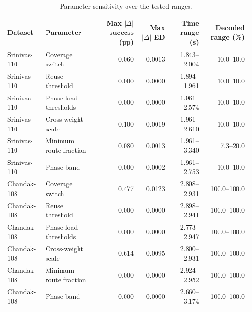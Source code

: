 \begin{table}[t]
\centering
\caption{Parameter sensitivity over the tested ranges.}
\label{tab:sensitivity-full}
\small
\begin{tabular}{llrrrr}
\hline
Dataset & Parameter & Max $|\Delta|$ success (pp) & Max $|\Delta|$ ED & Time range (s) & Decoded range (\%) \\
\hline
Srinivas-110 & Coverage switch & 0.060 & 0.0013 & 1.843--2.004 & 10.0--10.0 \\
Srinivas-110 & Reuse threshold & 0.000 & 0.0000 & 1.894--1.961 & 10.0--10.0 \\
Srinivas-110 & Phase-load thresholds & 0.000 & 0.0000 & 1.961--2.574 & 10.0--10.0 \\
Srinivas-110 & Cross-weight scale & 0.100 & 0.0019 & 1.961--2.610 & 10.0--10.0 \\
Srinivas-110 & Minimum route fraction & 0.080 & 0.0013 & 1.961--3.340 & 7.3--20.0 \\
Srinivas-110 & Phase band & 0.000 & 0.0002 & 1.961--2.753 & 10.0--10.0 \\
Chandak-108 & Coverage switch & 0.477 & 0.0123 & 2.808--2.931 & 100.0--100.0 \\
Chandak-108 & Reuse threshold & 0.000 & 0.0000 & 2.898--2.941 & 100.0--100.0 \\
Chandak-108 & Phase-load thresholds & 0.000 & 0.0000 & 2.773--2.947 & 100.0--100.0 \\
Chandak-108 & Cross-weight scale & 0.614 & 0.0095 & 2.800--2.931 & 100.0--100.0 \\
Chandak-108 & Minimum route fraction & 0.000 & 0.0000 & 2.924--2.952 & 100.0--100.0 \\
Chandak-108 & Phase band & 0.000 & 0.0000 & 2.660--3.174 & 100.0--100.0 \\
\hline
\end{tabular}
\end{table}
